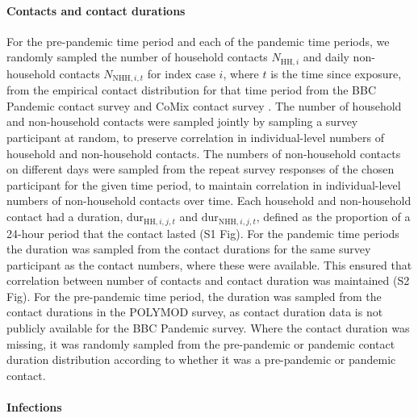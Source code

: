 \documentclass[
  10pt,
  letterpaper,
]{article}
\begin{document}
\paragraph{Contacts and contact
durations}\label{contacts-and-contact-durations}

For the pre-pandemic time period and each of the pandemic time periods,
we randomly sampled the number of household contacts
\(N_{\mathrm{HH},i}\) and daily non-household contacts
\(N_{\mathrm{NHH},i,t}\) for index case \(i\), where \(t\) is the time
since exposure, from the empirical contact distribution for that time
period from the BBC Pandemic contact survey
\citep{klepac2018, klepac2020, kucharski2020} and CoMix contact survey
\citep{jarvis2020, gimma2022}. The number of household and non-household
contacts were sampled jointly by sampling a survey participant at
random, to preserve correlation in individual-level numbers of household
and non-household contacts. The numbers of non-household contacts on
different days were sampled from the repeat survey responses of the
chosen participant for the given time period, to maintain correlation in
individual-level numbers of non-household contacts over time. Each
household and non-household contact had a duration,
\(\mathrm{dur}_{\mathrm{HH},i,j,t}\) and
\(\mathrm{dur}_{\mathrm{NHH},i,j,t}\), defined as the proportion of a
24-hour period that the contact lasted (S1 Fig). For the pandemic time
periods the duration was sampled from the contact durations for the same
survey participant as the contact numbers, where these were available.
This ensured that correlation between number of contacts and contact
duration was maintained (S2 Fig). For the pre-pandemic time period, the
duration was sampled from the contact durations in the POLYMOD survey,
as contact duration data is not publicly available for the BBC Pandemic
survey. Where the contact duration was missing, it was randomly sampled
from the pre-pandemic or pandemic contact duration distribution
according to whether it was a pre-pandemic or pandemic contact.

\paragraph{Infections}\label{infections}
\end{document}
